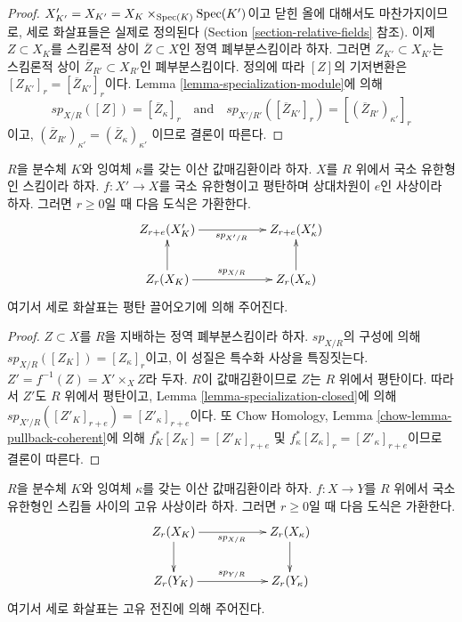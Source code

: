 \begin{proof}
$X'_{K'} = X_{K'} = X_K \times_{\mathop{\mathrm{Spec}}(K)} \mathop{\mathrm{Spec}}(K')$이고 닫힌 올에
대해서도 마찬가지이므로, 세로 화살표들은 실제로 정의된다
(Section \ref{section-relative-fields} 참조). 이제
$Z \subset X_K$를 스킴론적 상이 $\overline{Z} \subset X$인
정역 폐부분스킴이라 하자. 그러면 $Z_{K'} \subset X_{K'}$는
스킴론적 상이 $\overline{Z}_{R'} \subset X_{R'}$인 폐부분스킴이다.
정의에 따라 $[Z]$의 기저변환은
$[Z_{K'}]_r = [\overline{Z}_{K'}]_r$이다. Lemma
\ref{lemma-specialization-module}에 의해
$$
sp_{X/R}([Z]) = [\overline{Z}_\kappa]_r
\quad\text{and}\quad
sp_{X'/R'}([\overline{Z}_{K'}]_r) = [(\overline{Z}_{R'})_{\kappa'}]_r
$$
이고, $(\overline{Z}_{R'})_{\kappa'} = (\overline{Z}_\kappa)_{\kappa'}$
이므로 결론이 따른다.
\end{proof}

\begin{lemma}
\label{lemma-specialization-flat-pullback}
$R$을 분수체 $K$와 잉여체 $\kappa$를 갖는 이산 값매김환이라 하자.
$X$를 $R$ 위에서 국소 유한형인 스킴이라 하자.
$f : X' \to X$를 국소 유한형이고 평탄하며 상대차원이 $e$인
사상이라 하자. 그러면 $r \geq 0$일 때 다음 도식은 가환한다.
$$
\xymatrix{
Z_{r + e}(X'_K) \ar[rr]_{sp_{X'/R}} & & Z_{r + e}(X'_\kappa) \\
Z_r(X_K) \ar[rr]^{sp_{X/R}} \ar[u] & & Z_r(X_\kappa) \ar[u]
}
$$
여기서 세로 화살표는 평탄 끌어오기에 의해 주어진다.
\end{lemma}

\begin{proof}
$Z \subset X$를 $R$을 지배하는 정역 폐부분스킴이라 하자.
$sp_{X/R}$의 구성에 의해 $sp_{X/R}([Z_K]) = [Z_\kappa]_r$이고,
이 성질은 특수화 사상을 특징짓는다.
$Z' = f^{-1}(Z) = X' \times_X Z$라 두자. $R$이 값매김환이므로
$Z$는 $R$ 위에서 평탄이다. 따라서 $Z'$도 $R$ 위에서 평탄이고,
Lemma \ref{lemma-specialization-closed}에 의해
$sp_{X'/R}([Z'_K]_{r + e}) = [Z'_\kappa]_{r + e}$이다.
또 Chow Homology, Lemma \ref{chow-lemma-pullback-coherent}에 의해
$f_K^*[Z_K] = [Z'_K]_{r + e}$ 및
$f_\kappa^*[Z_\kappa]_r = [Z'_\kappa]_{r + e}$이므로 결론이 따른다.
\end{proof}

\begin{lemma}
\label{lemma-specialization-proper-pushforward}
$R$을 분수체 $K$와 잉여체 $\kappa$를 갖는 이산 값매김환이라 하자.
$f : X \to Y$를 $R$ 위에서 국소 유한형인 스킴들 사이의
고유 사상이라 하자. 그러면 $r \geq 0$일 때 다음 도식은 가환한다.
$$
\xymatrix{
Z_r(X_K) \ar[rr]_{sp_{X/R}} \ar[d] & & Z_r(X_\kappa) \ar[d] \\
Z_r(Y_K) \ar[rr]^{sp_{Y/R}} & & Z_r(Y_\kappa)
}
$$
여기서 세로 화살표는 고유 전진에 의해 주어진다.
\end{lemma}

